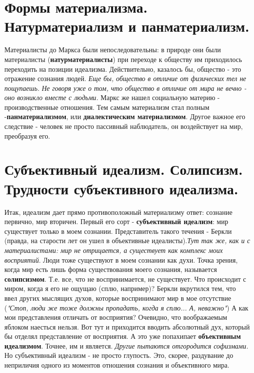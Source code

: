 \documentclass[12pt,a4paper]{article}
\begin{document}
\section{Формы материализма. Натурматериализм и панматериализм.}
Материалисты до Маркса были непоследовательны: в природе они были материалисты (\textbf{натурматериалисты}) при переходе к обществу им приходилось переходить на позиции идеализма. Действительно, казалось бы, общество - это отражение сознания людей. 
\textit{Еще бы, общество в отличие от физических тел не пощупаешь.}
\textit{Не говоря уже о том, что общество в отличие от мира не вечно - оно возникло вместе с людьми.} Маркс же нашел социальную материю - производственные отношения. Тем самым материализм стал полным -\textbf{панматериализмом}, или \textbf{диалектическим материализмом}. Другое важное его следствие - человек не просто пассивный наблюдатель, он воздействует на мир, преобразуя его.

\section{Субъективный идеализм. Солипсизм. Трудности субъективного идеализма.}
Итак, идеализм дает прямо противоположный материализму ответ: сознание первично, мир вторичен.  Первый его сорт - \textbf{субъективный идеализм}: мир существует только в моем сознании. Представитель такого течения - Беркли (правда, на старости лет он ушел в объективные идеалисты).\textit{Тут так же, как и с материалистами: мир не отрицается, а существует как комплекс моих восприятий}. Люди тоже существуют в моем сознании как духи.
Точка зрения, когда мир есть лишь форма существования моего сознания, называется \textbf{солипсизмом}. Т.е. все, что не воспринимается, не существует. Что происходит с миром, когда я его не ощущаю (сплю, например)? Беркли вкрутился тем, что ввел других мыслящих духов, которые воспринимают мир в мое отсутствие (\textit{"Стоп, люди же тоже должны пропадать, когда я сплю... А, неважно"}) А как мои представления отличать от восприятия? Очевидно, что воображаемым яблоком наесться нельзя. Вот тут и приходится вводить абсолютный дух, который бы отделял представление от восприятия. А это уже попахипает \textbf{объективным идеализмом}. Точнее, им и является. \textit{Другие пытаются отгородится софизмами.} Но субъективный идеализм - не просто глупость. Это, скорее, раздувание до неприличия одного из моментов отношения сознания и объективного мира.
\end{document}
